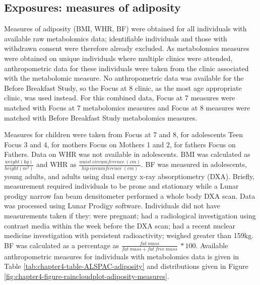 \documentclass[11pt,twoside]{bristolthesis}
\begin{document}
\hypertarget{exposures-measures-of-adiposity}{%
\subsection{Exposures: measures of adiposity}\label{exposures-measures-of-adiposity}}

Measures of adiposity (BMI, WHR, BF) were obtained for all individuals with available raw metabolomics data; identifiable individuals and those with withdrawn consent were therefore already excluded. As metabolomics measures were obtained on unique individuals where multiple clinics were attended, anthropometric data for these individuals were taken from the clinic associated with the metabolomic measure. No anthropometric data was available for the Before Breakfast Study, so the Focus at 8 clinic, as the most age appropriate clinic, was used instead. For this combined data, Focus at 7 measures were matched with Focus at 7 metabolomics measures and Focus at 8 measures were matched with Before Breakfast Study metabolomics measures.

Measures for children were taken from Focus at 7 and 8, for adolescents Teen Focus 3 and 4, for mothers Focus on Mothers 1 and 2, for fathers Focus on Fathers. Data on WHR was not available in adolescents. BMI was calculated as \(\displaystyle \frac{weight(kg)}{height (m^2)}\) and WHR as \(\displaystyle \frac{waist\ circumference\ (cm)} {hip\ circumference\ (cm)}\). BF was measured in adolescents, young adults, and adults using dual energy x-ray absorptiometry (DXA). Briefly, measurement required individuals to be prone and stationary while a Lunar prodigy narrow fan beam densitometer performed a whole body DXA scan. Data was processed using Lunar Prodigy software. Individuals did not have measurements taken if they: were pregnant; had a radiological investigation using contrast media within the week before the DXA scan; had a recent nuclear medicine investigation with persistent radioactivity; weighed greater than 159kg. BF was calculated as a percentage as \(\displaystyle \frac{fat\ mass} {fat\ mass + fat\ free\ mass}\ * 100\). Available anthropometric measures for individuals with metabolomics data is given in Table \ref{tab:chapter4-table-ALSPAC-adiposity} and distributions given in Figure \ref{fig:chapter4-figure-raincloudplot-adiposity-measures}.
\end{document}
